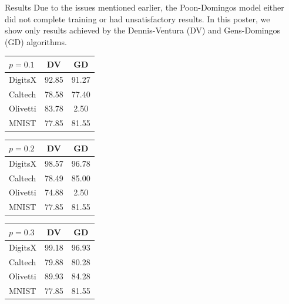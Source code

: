 \documentclass[final,hyperref={pdfpagelabels=false},notheorems]{beamer}
\theoremstyle{thesisstyle}
\newcommand{\pskip}{\vskip 0.5cm}
\begin{document}
\begin{frame}[t]
\begin{columns}[t]
\begin{column}{.5225\textwidth}
    \begin{block}{Results}
      Due to the issues mentioned earlier, the Poon-Domingos model either did not complete training
      or had unsatisfactory results. In this poster, we show only results achieved by the
      Dennis-Ventura (DV) and Gens-Domingos (GD) algorithms.\pskip

      \begin{table}[h]
        \begin{tabular}{l|c|c}
          $p=0.1$ & DV & GD\\
          \hline
          DigitsX & 92.85 & 91.27\\
          Caltech & 78.58 & 77.40\\
          Olivetti& 83.78 & 2.50\\
          MNIST   & 77.85 & 81.55\\
        \end{tabular}\hspace{2.5cm}
        \begin{tabular}{l|c|c}
          $p=0.2$ & DV & GD\\
          \hline
          DigitsX & 98.57 & 96.78\\
          Caltech & 78.49 & 85.00\\
          Olivetti& 74.88 & 2.50\\
          MNIST   & 77.85 & 81.55\\
        \end{tabular}\hspace{2.5cm}
        \begin{tabular}{l|c|c}
          $p=0.3$ & DV & GD\\
          \hline
          DigitsX & 99.18 & 96.93\\
          Caltech & 79.88 & 80.28\\
          Olivetti& 89.93 & 84.28\\
          MNIST   & 77.85 & 81.55\\
        \end{tabular}
      \end{table}
    \end{block}

  \end{column}


  \begin{column}{.02\textwidth}\end{column} %


\end{columns}
\end{frame}
\end{document}
